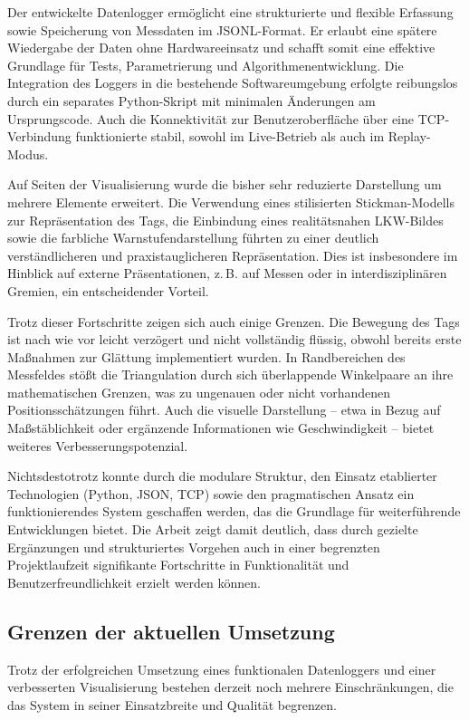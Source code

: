 \documentclass[a4paper, 12pt]{article} %
\begin{document}
Der entwickelte Datenlogger ermöglicht eine strukturierte und flexible Erfassung sowie Speicherung von Messdaten im \ac{JSONL}-Format. Er erlaubt eine 
spätere Wiedergabe der Daten ohne Hardwareeinsatz und schafft somit eine effektive Grundlage für Tests, Parametrierung und Algorithmenentwicklung. 
Die Integration des Loggers in die bestehende Softwareumgebung erfolgte reibungslos durch ein separates Python-Skript mit minimalen Änderungen am 
Ursprungscode. Auch die Konnektivität zur Benutzeroberfläche über eine \ac{TCP}-Verbindung funktionierte stabil, sowohl im Live-Betrieb als auch im 
Replay-Modus.

Auf Seiten der Visualisierung wurde die bisher sehr reduzierte Darstellung um mehrere Elemente erweitert. Die Verwendung eines stilisierten 
Stickman-Modells zur Repräsentation des Tags, die Einbindung eines realitätsnahen \ac{LKW}-Bildes sowie die farbliche Warnstufendarstellung 
führten zu einer deutlich verständlicheren und praxistauglicheren Repräsentation. Dies ist insbesondere im Hinblick auf externe Präsentationen, 
z.\,B. auf Messen oder in interdisziplinären Gremien, ein entscheidender Vorteil.

Trotz dieser Fortschritte zeigen sich auch einige Grenzen. Die Bewegung des Tags ist nach wie vor leicht verzögert und nicht vollständig flüssig, 
obwohl bereits erste Maßnahmen zur Glättung implementiert wurden. In Randbereichen des Messfeldes stößt die Triangulation durch sich überlappende 
Winkelpaare an ihre mathematischen Grenzen, was zu ungenauen oder nicht vorhandenen Positionsschätzungen führt. Auch die visuelle Darstellung – etwa in 
Bezug auf Maßstäblichkeit oder ergänzende Informationen wie Geschwindigkeit – bietet weiteres Verbesserungspotenzial.

Nichtsdestotrotz konnte durch die modulare Struktur, den Einsatz etablierter Technologien (Python, JSON, \ac{TCP}) sowie den pragmatischen Ansatz ein 
funktionierendes System geschaffen werden, das die Grundlage für weiterführende Entwicklungen bietet. Die Arbeit zeigt damit deutlich, dass durch 
gezielte Ergänzungen und strukturiertes Vorgehen auch in einer begrenzten Projektlaufzeit signifikante Fortschritte in Funktionalität und 
Benutzerfreundlichkeit erzielt werden können.

\subsection{Grenzen der aktuellen Umsetzung}

Trotz der erfolgreichen Umsetzung eines funktionalen Datenloggers und einer verbesserten Visualisierung bestehen derzeit noch mehrere Einschränkungen, 
die das System in seiner Einsatzbreite und Qualität begrenzen.
\end{document}

